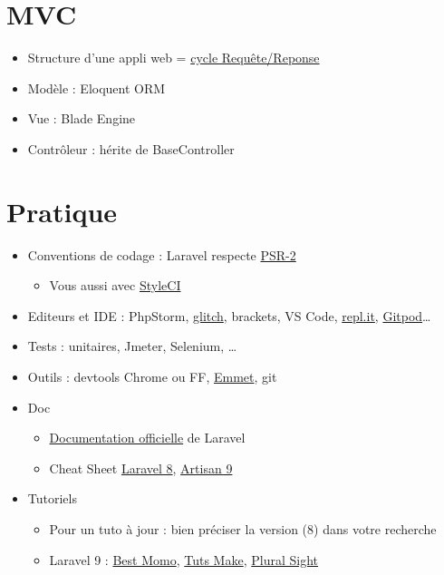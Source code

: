 \hypertarget{mvc}{%
\section{MVC}\label{mvc}}

\begin{itemize}
\tightlist
\item
  Structure d'une appli web =
  \href{https://laravel.com/docs/master/lifecycle}{cycle
  Requête/Reponse}
\item
  Modèle : Eloquent ORM
\item
  Vue : Blade Engine
\item
  Contrôleur : hérite de BaseController
\end{itemize}

\hypertarget{pratique}{%
\section{Pratique}\label{pratique}}

\begin{itemize}
\tightlist
\item
  Conventions de codage : Laravel respecte
  \href{https://laravel.com/docs/5.1/contributions\#coding-style}{PSR-2}

  \begin{itemize}
  \tightlist
  \item
    Vous aussi avec \href{https://styleci.io/}{StyleCI}
  \end{itemize}
\item
  Editeurs et IDE : PhpStorm, \href{https://glitch.com/}{glitch},
  brackets, VS Code, \href{https://repl.it/}{repl.it},
  \href{https://www.gitpod.io/}{Gitpod}\ldots{}
\item
  Tests : unitaires, Jmeter, Selenium, \ldots{}
\item
  Outils : devtools Chrome ou FF, \href{http://emmet.io/}{Emmet}, git
\item
  Doc

  \begin{itemize}
  \tightlist
  \item
    \href{https://laravel.com/docs/master}{Documentation officielle} de
    Laravel
  \item
    Cheat Sheet \href{https://learninglaravel.net/cheatsheet/}{Laravel
    8}, \href{https://artisan.page/}{Artisan 9}
  \end{itemize}
\item
  Tutoriels

  \begin{itemize}
  \tightlist
  \item
    Pour un tuto à jour : bien préciser la version (8) dans votre
    recherche
  \item
    Laravel 9 : \href{https://laravel.sillo.org/laravel-9/}{Best Momo},
    \href{https://www.tutsmake.com/page/1/?s=tutorial+laravel+9}{Tuts
    Make},
    \href{https://www.pluralsight.com/courses/laravel-9-fundamentals}{Plural
    Sight}
  \end{itemize}
\end{itemize}

